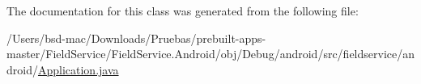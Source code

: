 The documentation for this class was generated from the following file\+:\begin{DoxyCompactItemize}
\item 
/\+Users/bsd-\/mac/\+Downloads/\+Pruebas/prebuilt-\/apps-\/master/\+Field\+Service/\+Field\+Service.\+Android/obj/\+Debug/android/src/fieldservice/android/\hyperlink{_application_8java}{Application.\+java}\end{DoxyCompactItemize}
